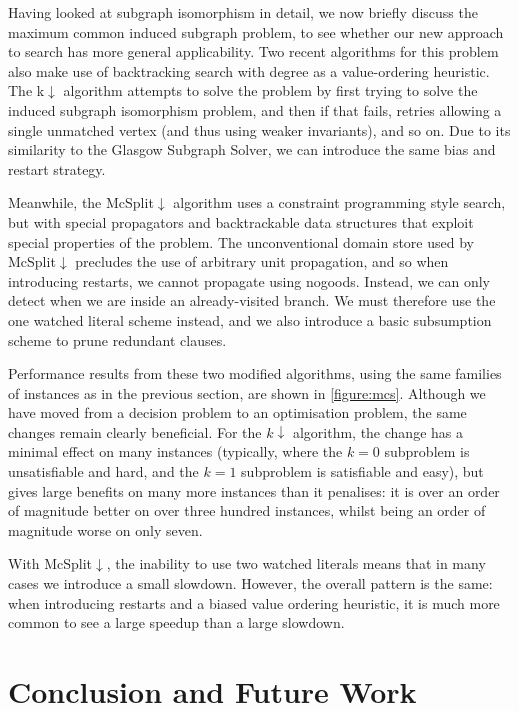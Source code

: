 \documentclass[runningheads]{llncs}
\begin{document}
Having looked at subgraph isomorphism in detail, we now briefly discuss the maximum common induced
subgraph problem, to see whether our new approach to search has more general applicability.  Two
recent algorithms for this problem also make use of backtracking search with degree as a
value-ordering heuristic. The k${\downarrow}$ algorithm \cite{DBLP:conf/aaai/HoffmannMR17} attempts
to solve the problem by first trying to solve the induced subgraph isomorphism problem, and then if
that fails, retries allowing a single unmatched vertex (and thus using weaker invariants), and so
on. Due to its similarity to the Glasgow Subgraph Solver, we can introduce the same bias and restart
strategy.

Meanwhile, the McSplit${\downarrow}$ algorithm
\cite{DBLP:conf/ijcai/McCreeshPT17} uses a constraint programming style search, but with special
propagators and backtrackable data structures that exploit special properties of the problem. The
unconventional domain store used by McSplit${\downarrow}$ precludes the use of arbitrary unit
propagation, and so when introducing restarts, we cannot propagate using nogoods.  Instead, we can
only detect when we are inside an already-visited branch.  We must therefore use the one watched
literal scheme instead, and we also introduce a basic subsumption scheme to prune redundant clauses.

Performance results from these two modified algorithms, using the same families of instances as in
the previous section, are shown in \cref{figure:mcs}. Although we have
moved from a decision problem to an optimisation problem, the same changes remain clearly
beneficial. For the $k{\downarrow}$ algorithm, the change has a minimal effect on many instances
(typically, where the $k = 0$ subproblem is unsatisfiable and hard, and the $k = 1$ subproblem is
satisfiable and easy), but gives large benefits on many more instances than it penalises: it is over
an order of magnitude better on over three hundred instances, whilst being an order of magnitude worse
on only seven.

With McSplit${\downarrow}$, the inability to use two watched literals means that in many cases we
introduce a small slowdown. However, the overall pattern is the same: when introducing restarts and
a biased value ordering heuristic, it is much more common to see a large speedup than a large
slowdown.

\section{Conclusion and Future Work}
\end{document}
